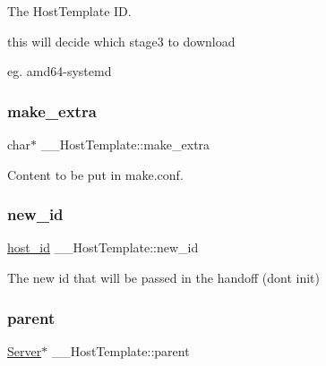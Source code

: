 The Host\+Template ID. 

this will decide which stage3 to download
\begin{DoxyItemize}
\item eg. amd64-\/systemd 
\end{DoxyItemize}\mbox{\label{struct_____host_template_a7225136c3e9e14ca6a469fedb2cfd22a}} 
\subsubsection{\texorpdfstring{make\+\_\+extra}{make\_extra}}
{\footnotesize\ttfamily char$\ast$ \+\_\+\+\_\+\+Host\+Template\+::make\+\_\+extra}



Content to be put in make.\+conf. 

\mbox{\label{struct_____host_template_ae7564721dc0d66845c5238ae141035c8}} 
\subsubsection{\texorpdfstring{new\+\_\+id}{new\_id}}
{\footnotesize\ttfamily \mbox{\hyperlink{host_8h_ad9a5413d8b4376a70706368c97972c2b}{host\+\_\+id}} \+\_\+\+\_\+\+Host\+Template\+::new\+\_\+id}



The new id that will be passed in the handoff (don\textquotesingle{}t init) 

\mbox{\label{struct_____host_template_aa8239544f5fd3a31a47940c7c0de5c5c}} 
\subsubsection{\texorpdfstring{parent}{parent}}
{\footnotesize\ttfamily \mbox{\hyperlink{server_8h_a705d964b8a67edeeb3943273a397e4c2}{Server}}$\ast$ \+\_\+\+\_\+\+Host\+Template\+::parent}



